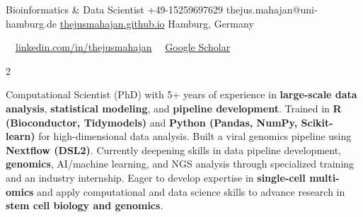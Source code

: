 \documentclass{thejus_cv}
\begin{document}
         {Bioinformatics \& Data Scientist}
         {+49-15259697629}
         {thejus.mahajan@uni-hamburg.de}
         {\href{https://thejusmahajan.github.io}{thejusmahajan.github.io}}
         {Hamburg, Germany}

\vspace{-0.5cm}
{\small\color{white}
\faLinkedin\ \ \href{https://www.linkedin.com/in/thejusmahajan/}{linkedin.com/in/thejusmahajan}
\hspace{0.5cm}
\faGraduationCap\ \ \href{https://scholar.google.com/citations?user=PJkZwAwAAAAJ}{Google Scholar}
}\par
\vspace{0.1cm}
\begin{paracol}{2}


Computational Scientist (PhD) with 5+ years of experience in \textbf{large-scale data analysis}, \textbf{statistical modeling}, and \textbf{pipeline development}. Trained in \textbf{R (Bioconductor, Tidymodels)} and \textbf{Python (Pandas, NumPy, Scikit-learn)} for high-dimensional data analysis. Built a viral genomics pipeline using \textbf{Nextflow (DSL2)}. Currently deepening skills in data pipeline development, \textbf{genomics}, AI/machine learning, and NGS analysis through specialized training and an industry internship. Eager to develop expertise in \textbf{single-cell multi-omics} and apply computational and data science skills to advance research in \textbf{stem cell biology and genomics}.



\end{paracol}
\end{document}
